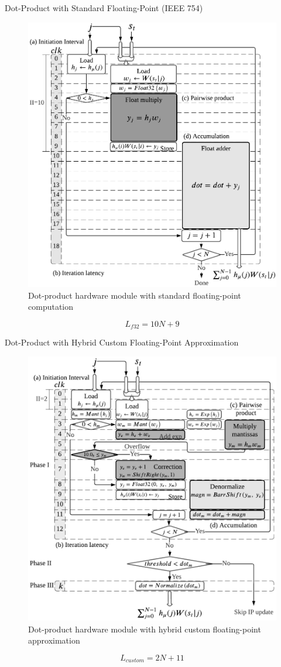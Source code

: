 \begin{frame}{Dot-Product with Standard Floating-Point (IEEE 754)}
	\begin{figure}
		\centering
		\includegraphics[width=0.4\columnwidth]{../chapters/sbs_accelerator/figures/dot_product_float.pdf}
		\caption{Dot-product hardware module with standard floating-point computation}
	\end{figure}
	
	\vfill %
	
	\[
	L_{f32}=10N+9
	\]
\end{frame}

\begin{frame}{Dot-Product with Hybrid Custom Floating-Point Approximation}
	\begin{figure}
		\centering
		\includegraphics[width=0.4\columnwidth]{../chapters/sbs_accelerator/figures/dot_product.pdf}
		\caption{Dot-product hardware module with hybrid custom floating-point approximation}
	\end{figure}
	
	\vfill %
	
	\[
	L_{custom}=2N+11
	\]
\end{frame}

